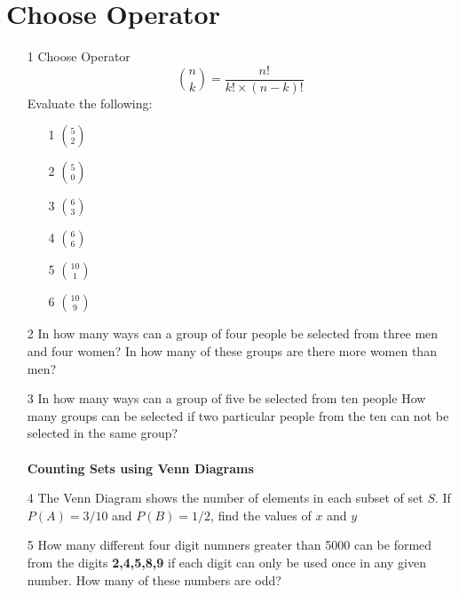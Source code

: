 \documentclass[a4paper,12pt]{article}
\begin{document}
\section{Choose Operator}
\begin{itemize}


\item[1] Choose Operator
\[ {n \choose k} = \frac{n!}{k! \times (n-k)!} \]
Evaluate the following:
\begin{multicols}{3}
    \begin{enumerate}
    \item[1] ${5 \choose 2}$
    \item[2] ${5 \choose 0}$
    \item[3] ${6 \choose 3}$
    \item[4] ${6 \choose 6}$
    \item[5] ${10 \choose 1}$
    \item[6] ${10 \choose 9}$
    \end{enumerate}        
  \end{multicols}
\item[2] In how many ways can a group of four people be selected from three men and four women?
In how many of these groups are there more women than men?
\item[3] In how many ways can a group of five be selected from ten people
How many groups can be selected if two particular people from the ten can not be selected in the same group?\\
\\
\textbf{Counting Sets using Venn Diagrams}
\item[4] 
The Venn Diagram shows the number of elements in each subset of set $S$.
If $P(A) = 3/10$ and $P(B) = 1/2$, find the values of $x$ and $y$

\item[5] How many different four digit numners greater than 5000 can be formed from the digits \textbf{2,4,5,8,9} if each digit can only be used once in any given number. How many of these numbers are odd?
\end{itemize}

\newpage
\end{document}
